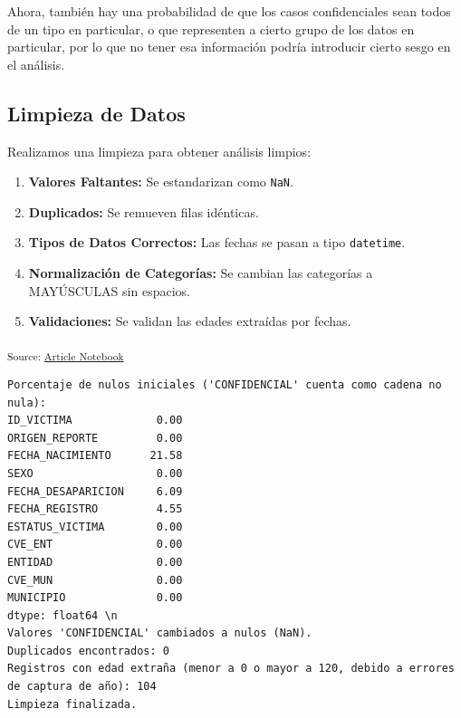 \documentclass[
]{agujournal2019}
\providecommand{\tightlist}{%
  \setlength{\itemsep}{0pt}\setlength{\parskip}{0pt}}
\begin{document}
Ahora, también hay una probabilidad de que los casos confidenciales sean
todos de un tipo en particular, o que representen a cierto grupo de los
datos en particular, por lo que no tener esa información podría
introducir cierto sesgo en el análisis.

\subsection{Limpieza de Datos}\label{limpieza-de-datos}

Realizamos una limpieza para obtener análisis limpios:

\begin{enumerate}
\def\labelenumi{\arabic{enumi}.}
\tightlist
\item
  \textbf{Valores Faltantes:} Se estandarizan como \texttt{NaN}.
\item
  \textbf{Duplicados:} Se remueven filas idénticas.
\item
  \textbf{Tipos de Datos Correctos:} Las fechas se pasan a tipo
  \texttt{datetime}.
\item
  \textbf{Normalización de Categorías:} Se cambian las categorías a
  MAYÚSCULAS sin espacios.
\item
  \textbf{Validaciones:} Se validan las edades extraídas por fechas.
\end{enumerate}

\textsubscript{Source:
\href{https://Rou-uu.github.io/pruebaQuarto/index.qmd.html}{Article
Notebook}}

\begin{verbatim}
Porcentaje de nulos iniciales ('CONFIDENCIAL' cuenta como cadena no nula):
ID_VICTIMA             0.00
ORIGEN_REPORTE         0.00
FECHA_NACIMIENTO      21.58
SEXO                   0.00
FECHA_DESAPARICION     6.09
FECHA_REGISTRO         4.55
ESTATUS_VICTIMA        0.00
CVE_ENT                0.00
ENTIDAD                0.00
CVE_MUN                0.00
MUNICIPIO              0.00
dtype: float64 \n
Valores 'CONFIDENCIAL' cambiados a nulos (NaN).
Duplicados encontrados: 0
Registros con edad extraña (menor a 0 o mayor a 120, debido a errores de captura de año): 104
Limpieza finalizada.
\end{verbatim}
\end{document}
